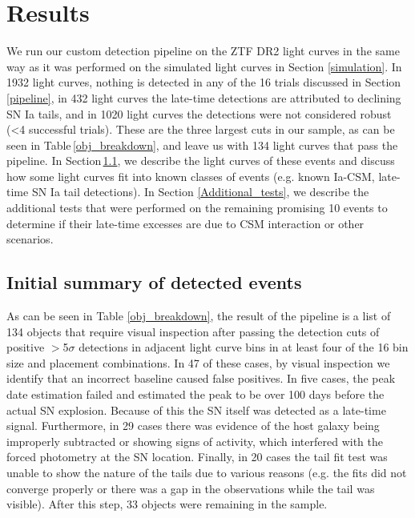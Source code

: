 \documentclass[a4paper,oneside,12pt, class=Latex/Classes/PhDthesisPSnPDF, crop=false]{standalone}
\begin{document}
\section{Results}
\label{results}

We run our custom detection pipeline on the ZTF DR2 light curves in the same way as it was performed on the simulated light curves in Section \ref{simulation}. In 1932 light curves, nothing is detected in any of the 16 trials discussed in Section \ref{pipeline}, in 432 light curves the late-time detections are attributed to declining SN Ia tails, and in 1020 light curves the detections were not considered robust (<4 successful trials). These are the three largest cuts in our sample, as can be seen in Table\,\ref{obj_breakdown}, and leave us with 134 light curves that pass the pipeline. In Section\,\ref{results_summary}, we describe the light curves of these events and discuss how some light curves fit into known classes of events (e.g. known Ia-CSM, late-time SN Ia tail detections). In Section \ref{Additional_tests}, we describe the additional tests that were performed on the remaining promising 10 events to determine if their late-time excesses are due to CSM interaction or other scenarios. 


\subsection{Initial summary of detected events}
\label{results_summary}

As can be seen in Table \ref{obj_breakdown}, the result of the pipeline is a list of 134 objects that require visual inspection after passing the detection cuts of positive $>$5$\sigma$ detections in adjacent light curve bins in at least four of the 16 bin size and placement combinations. In 47 of these cases, by visual inspection we identify that an incorrect baseline caused false positives. In five cases, the peak date estimation failed and estimated the peak to be over 100 days before the actual SN explosion. Because of this the SN itself was detected as a late-time signal. Furthermore, in 29 cases there was evidence of the host galaxy being improperly subtracted or showing signs of activity, which interfered with the forced photometry at the SN location. Finally, in 20 cases the tail fit test was unable to show the nature of the tails due to various reasons (e.g. the fits did not converge properly or there was a gap in the observations while the tail was visible). After this step, 33 objects were remaining in the sample.
\end{document}

